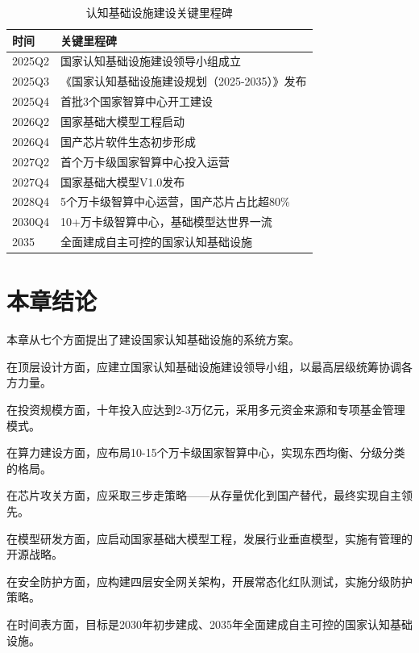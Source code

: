 \begin{table}[H]
\centering
\caption{认知基础设施建设关键里程碑}
\small
\begin{tabular}{p{2cm}p{10cm}}
\toprule
\textbf{时间} & \textbf{关键里程碑} \\
\midrule
2025Q2 & 国家认知基础设施建设领导小组成立 \\
2025Q3 & 《国家认知基础设施建设规划（2025-2035）》发布 \\
2025Q4 & 首批3个国家智算中心开工建设 \\
2026Q2 & 国家基础大模型工程启动 \\
2026Q4 & 国产芯片软件生态初步形成 \\
2027Q2 & 首个万卡级国家智算中心投入运营 \\
2027Q4 & 国家基础大模型V1.0发布 \\
2028Q4 & 5个万卡级智算中心运营，国产芯片占比超80\% \\
2030Q4 & 10+万卡级智算中心，基础模型达世界一流 \\
2035 & 全面建成自主可控的国家认知基础设施 \\
\bottomrule
\end{tabular}
\end{table}

\section{本章结论}

本章从七个方面提出了建设国家认知基础设施的系统方案。

在顶层设计方面，应建立国家认知基础设施建设领导小组，以最高层级统筹协调各方力量。

在投资规模方面，十年投入应达到2-3万亿元，采用多元资金来源和专项基金管理模式。

在算力建设方面，应布局10-15个万卡级国家智算中心，实现东西均衡、分级分类的格局。

在芯片攻关方面，应采取三步走策略——从存量优化到国产替代，最终实现自主领先。

在模型研发方面，应启动国家基础大模型工程，发展行业垂直模型，实施有管理的开源战略。

在安全防护方面，应构建四层安全网关架构，开展常态化红队测试，实施分级防护策略。

在时间表方面，目标是2030年初步建成、2035年全面建成自主可控的国家认知基础设施。

